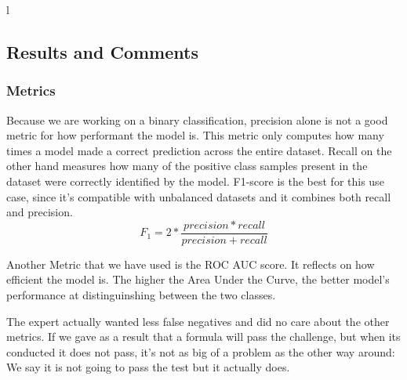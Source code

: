 l\documentclass[a4paper,12pt,twoside]{report}
\begin{document}
\subsection{Results and Comments}
\subsubsection{Metrics}
Because we are working on a binary classification, precision alone is not a good metric for how performant the model is. This metric only computes how many times a model made a correct prediction across the entire dataset. Recall on the other hand measures how many of the positive class samples present in the dataset were correctly identified by the model.
F1-score is the best for this use case, since it's compatible with unbalanced datasets and it combines both recall and precision. 
$$ F_1 = 2 * \frac{precision * recall }{precision + recall} $$

Another Metric that we have used is the ROC AUC score. It reflects on how efficient the model is. The higher the Area Under the Curve, the better model's performance at distinguinshing between the two classes.

The expert actually wanted less false negatives and did no care about the other metrics. If we gave as a result that a formula will pass the challenge, but when its conducted it does not pass, it's not as big of a problem as the other way around: We say it is not going to pass the test but it actually does.
\end{document}
